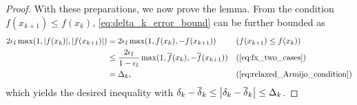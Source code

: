 \documentclass[journal]{subfiles}
\begin{document}
\begin{proof}
    With these preparations, we now prove the lemma.
    From the condition $f(x_{k+1}) \le f(x_k)$, \cref{eq:delta_k_error_bound} can be further bounded as
    \begin{align*}
        2 \feps \max(1,\abs{f(x_k)},\abs{f(x_{k+1})})
         & = 2 \feps \max(1,f(x_k),-f(x_{k+1}))                                        &  & (\text{$f(x_{k+1}) \le f(x_k)$}) \\
         & \le \frac{2 \feps}{1-\feps}\max(1,\overline{f}(x_k),-\overline{f}(x_{k+1})) &  & (\text{\cref{eq:fx_two_cases}})  \\
         & = \Delta_k,                                                                 &  &
        (\text{\cref{eq:relaxed_Armijo_condition}})
    \end{align*}
    which yields the desired inequality with $\delta_k - \overline{\delta}_k \leq \abs{\delta_k - \overline{\delta}_k} \leq \Delta_k$.
    \myQED
\end{proof}
\end{document}
